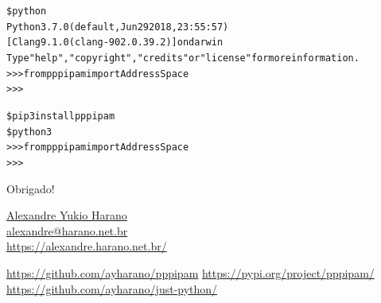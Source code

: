 \documentclass[11pt]{beamer}
\begin{document}
\begin{frame}[fragile]
\begin{alltt}\scriptsize
\$ python
Python 3.7.0 (default, Jun 29 2018, 23:55:57)
[Clang 9.1.0 (clang-902.0.39.2)] on darwin
Type "help", "copyright", "credits" or "license" for more information.
>>> from pppipam import AddressSpace
>>>
\end{alltt}
\end{frame}

\begin{frame}[standout]
\begin{alltt}
\$ pip3 install pppipam\newline
\newline
\$ python3\newline
>>> from pppipam import AddressSpace\\
>>>
\end{alltt}
\end{frame}


\begin{frame}[standout]
  \vspace*{2cm}
  \huge{Obrigado!}
  \begin{block}{}
    \vspace*{-.5cm}
    \begin{flushright}
      \large{\href{https://alexandre.harano.net.br/}{Alexandre Yukio Harano}} \\ \vspace*{0.1cm}
      \small{\href{mailto:alexandre@harano.net.br}{alexandre@harano.net.br}} \\
      \small{\url{https://alexandre.harano.net.br/}}
    \end{flushright}
    \vspace*{.2cm}
    \begin{flushleft}
      \normalsize{\url{https://github.com/ayharano/pppipam}}
      \normalsize{\url{https://pypi.org/project/pppipam/}}
      \normalsize{\url{https://github.com/ayharano/just-python/}}
    \end{flushleft}
  \end{block}
\end{frame}
\end{document}
